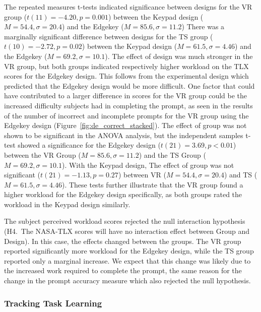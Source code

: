 The repeated measures t-tests indicated significance between designs for the VR group ($t(11) = -4.20, p = 0.001$) between the Keypad design ($M = 54.4, \sigma = 20.4$) and the Edgekey ($M = 85.6, \sigma = 11.2$)
There was a marginally significant difference between designs for the TS group ($t(10) = -2.72, p = 0.02$) between the Keypad design ($M = 61.5, \sigma = 4.46$) and the Edgekey ($M = 69.2, \sigma = 10.1$).
The effect of design was much stronger in the VR group, but both groups indicated respectively higher workload on the TLX scores for the Edgekey design.
This follows from the experimental design which predicted that the Edgekey design would be more difficult.
One factor that could have contributed to a larger difference in scores for the VR group could be the increased difficulty subjects had in completing the prompt, as seen in the results of the number of incorrect and incomplete prompts for the VR group using the Edgekey design (Figure~\ref{fig:de_correct_stacked}).
The effect of group was not shown to be significant in the ANOVA analysis, but the independent samples t-test showed a significance for the Edgekey design ($t(21) = 3.69, p < 0.01$) between the VR Group ($M = 85.6, \sigma = 11.2$) and the TS Group ($M = 69.2, \sigma = 10.1$).
With the Keypad design, The effect of group was not significant ($t(21) = -1.13, p=0.27$) between VR ($M = 54.4, \sigma = 20.4$) and TS ($M = 61.5, \sigma = 4.46$).
These tests further illustrate that the VR group found a higher workload for the Edgekey design specifically, as both groups rated the workload in the Keypad design similarly.

The subject perceived workload scores rejected the null interaction hypothesis (H4.\ The NASA-TLX scores will have no interaction effect between Group and Design).
In this case, the effects changed between the groups.
The VR group reported significantly more workload for the Edgekey design, while the TS group reported only a marginal increase.
We expect that this change was likely due to the increased work required to complete the prompt, the same reason for the change in the prompt accuracy measure which also rejected the null hypothesis.

\subsubsection{Tracking Task Learning}

